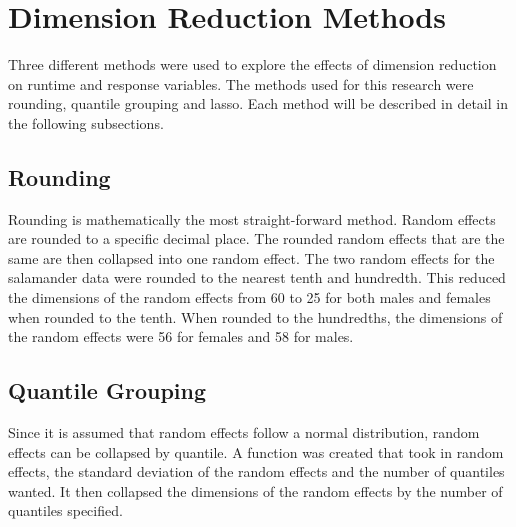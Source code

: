 \documentclass{article}
\begin{document}
\section{Dimension Reduction Methods}
Three different methods were used to explore the effects of dimension reduction on runtime and response variables.  The methods used for this research were rounding, quantile grouping and lasso.  Each method will be described in detail in the following subsections.

\subsection{Rounding}
	Rounding is mathematically the most straight-forward method.  Random effects are rounded to a specific decimal place.  The rounded random effects that are the same are then collapsed into one random effect.  The two random effects for the salamander data were rounded to the nearest tenth and hundredth.  This reduced the dimensions of the random effects from 60 to 25 for both males and females when rounded to the tenth.  When rounded to the hundredths, the dimensions of the random effects were 56 for females and 58 for males.  

\subsection{Quantile Grouping}
	Since it is assumed that random effects follow a normal distribution, random effects can be collapsed by quantile.  A function was created that took in random effects, the standard deviation of the random effects and the number of quantiles wanted.  It then collapsed the dimensions of the random effects by the number of quantiles specified. 



\end{document}
